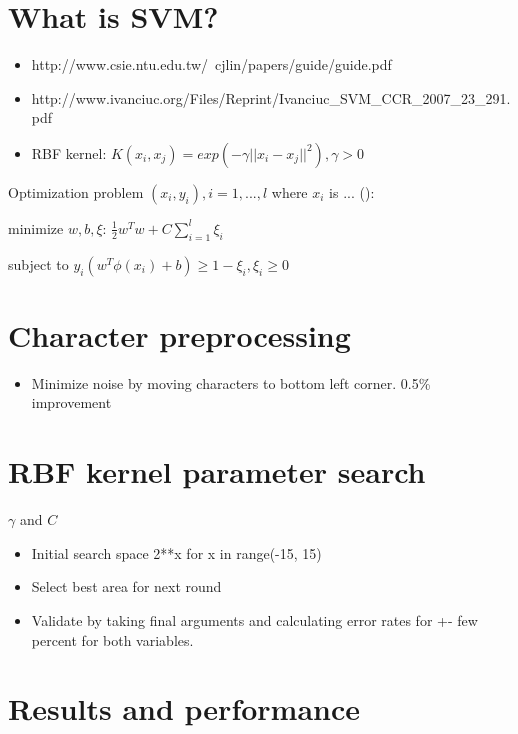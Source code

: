 \documentclass{netsec2012}
\begin{document}
\section{What is SVM?}

\begin{itemize}
\item http://www.csie.ntu.edu.tw/~cjlin/papers/guide/guide.pdf
\item http://www.ivanciuc.org/Files/Reprint/Ivanciuc\_SVM\_CCR\_2007\_23\_291.pdf
\item RBF kernel: $K(x_i, x_j) = exp(-\gamma || x_i - x_j ||^2), \gamma > 0$
\end{itemize}

Optimization problem $(x_i, y_i), i = 1, ..., l$ where $x_i$ is ... (\cite{libsvm_guide}):

minimize $w,b,\xi$: $\frac{1}{2}w^Tw + C \sum_{i=1}^l\xi_i$

subject to $y_i(w^T \phi(x_i) + b) \ge 1 - \xi_i, \xi_i \ge 0$

\section{Character preprocessing}

\begin{itemize}
\item Minimize noise by moving characters to bottom left corner. 0.5\% improvement
\end{itemize}

\section{RBF kernel parameter search}

$\gamma$ and $C$

\label{ref:crossvalidation}

\begin{itemize}
\item Initial search space 2**x for x in range(-15, 15)
\item Select best area for next round
\item Validate by taking final arguments and calculating error rates for +- few percent for both variables.
\end{itemize}

\section{Results and performance}
\end{document}
